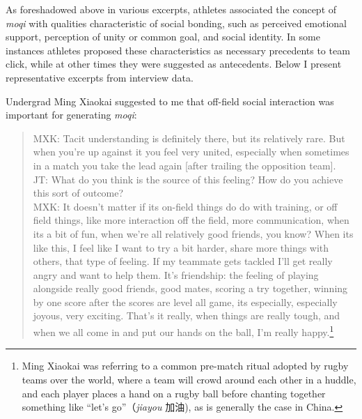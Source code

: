 \begin{CJK}{UTF8}{gbsn}



As foreshadowed above in various excerpts, athletes associated the concept of \textit{moqi} with qualities characteristic of social bonding, such as perceived emotional support, perception of unity or common goal, and social identity.  In some instances athletes proposed these characteristics as necessary precedents to team click, while at other times they were suggested as antecedents.  Below I present representative excerpts from interview data.

Undergrad Ming Xiaokai suggested to me that off-field social interaction was important for generating \textit{moqi}:

    \begin{quote}
        MXK: Tacit understanding is definitely there, but its relatively rare. But when you’re up against it you feel very united, especially when sometimes in a match you take the lead again [after trailing the opposition team]. \\

        JT: What do you think is the source of this feeling?  How do you achieve this sort of outcome? \\

        MXK: It doesn’t matter if its on-field things do do with training, or off field things, like more interaction off the field, more communication, when its a bit of fun, when we're all relatively good friends, you know?  When its like this, I feel like I want to try a bit harder, share more things with others, that type of feeling.  If my teammate gets tackled I'll get really angry and want to help them.  It's friendship: the feeling of playing alongside really good friends, good mates, scoring a try together, winning by one score after the scores are level all game, its especially, especially joyous, very exciting.  That's it really, when things are really tough, and when we all come in and put our hands on the ball, I’m really happy.\footnote{Ming Xiaokai was referring to a common pre-match ritual adopted by rugby teams over the world, where a team will crowd around each other in a huddle, and each player places a hand on a rugby ball before chanting together something like ``let's go''（\textit{jiayou} 加油), as is generally the case in China.}
    \end{quote}


\end{CJK}
